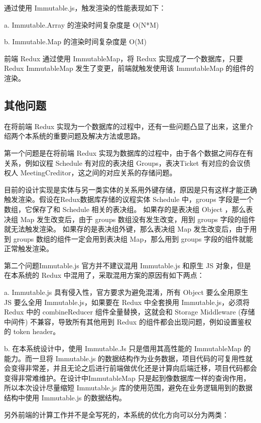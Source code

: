   通过使用 Immutable.js，触发渲染的性能表现如下：

  \quad{}a. Immutable.Array 的渲染时间复杂度是 O(N*M)

  \quad{}b. Immutable.Map 的渲染时间复杂度是 O(M)

  前端 Redux 通过使用 ImmutableMap，将 Redux 实现成了一个数据库，只要 Redux ImmutableMap 发生了变更，前端就触发使用该 ImmutableMap 的组件的渲染。

  \subsection{其他问题}
  在将前端 Redux 实现为一个数据库的过程中，还有一些问题凸显了出来，这里介绍两个本系统的重要问题及解决方法或思路。

  第一个问题是在将前端 Redux 实现为数据库的过程中，由于各个数据之间存在有关系，例如议程 Schedule 有对应的表决组 Groups，表决Ticket 有对应的会议债权人 MeetingCreditor，这之间的对应关系的存储问题。

  目前的设计实现是实体与另一类实体的关系用外键存储，原因是只有这样才能正确触发渲染。假设在Redux数据库存储的议程实体 Schedule 中，groups 字段是一个数组，它保存了和 Schedule 相关的表决组。
  如果存的是表决组 Object ，那么表决组 Map 发生改变后，由于 groups 数组没有发生改变，用到 groups 字段的组件就无法触发渲染。
  如果存的是表决组外键，那么表决组 Map 发生改变后，由于用到 groups 数组的组件一定会用到表决组 Map，那么用到 groups 字段的组件就能正常触发渲染。

  第二个问题Immutable.js 官方并不建议混用 Immutable.js 和原生 JS 对象，但是在本系统的 Redux 中混用了，采取混用方案的原因有如下两点：

  \quad{}a. Immutable.js 具有侵入性，官方要求为避免混淆，所有 Object 要么全用原生 JS 要么全用 Immutable.js，如果要在 Redux 中全套换用 Immutable.js，必须将 Redux 中的 combineReducer 组件全量替换，这就会和 Storage Middleware (存储中间件) 不兼容，导致所有其他用到 Redux 的组件都会出现问题，例如设置鉴权的 token header。


  \quad{}b. 在本系统设计中，使用 Immutable.Js 只是借用其高性能的 ImmutableMap 的能力。而一旦将 Immutable.js 的数据结构作为业务数据，项目代码的可复用性就会变得非常差，并且无论之后进行前端做优化还是计算向后端迁移，项目代码都会变得非常难维护。在设计中ImmutableMap 只是起到像数据库一样的查询作用，所以本次设计尽量缩短 Immutable.js 库的使用范围，避免在业务逻辑用到的数据结构中使用 Immutable.js 的数据结构。

  另外前端的计算工作并不是全写死的，本系统的优化方向可以分为两类：

